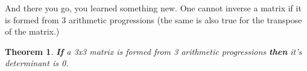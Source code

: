 \documentclass[12pt]{article}
\newtheorem{theorem}{Theorem}
\begin{document}
	And there you go, you learned something new. One cannot inverse a matrix if it is formed from 3 arithmetic progressions (the same is also true for the transpose of the matrix.)
	
	\begin{theorem}
		\textbf{If} a 3x3 matrix is formed from 3 arithmetic progressions \textbf{then} it's determinant is 0.
	\end{theorem}

	

	\newpage
	{}
	
\end{document}
